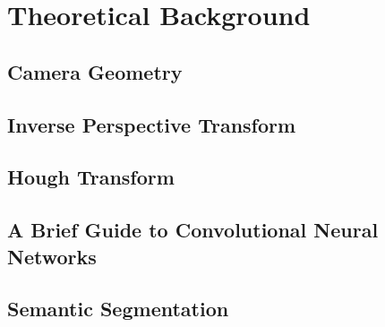 

    \chapter{Theoretical Background}

    \section{Camera Geometry}
   
    \section{Inverse Perspective Transform}
    
    \section{Hough Transform}
    
    \section{A Brief Guide to Convolutional Neural Networks}
    
    \section{Semantic Segmentation}
    

